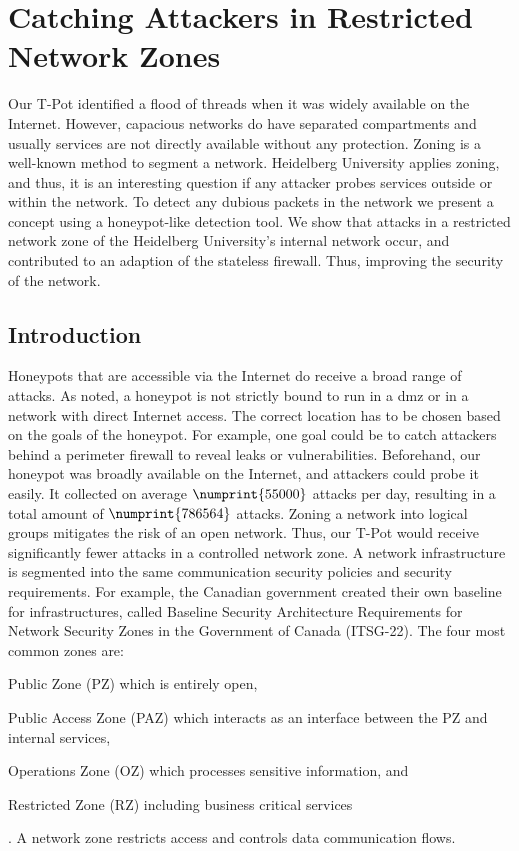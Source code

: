 \chapter{Catching Attackers in Restricted Network Zones}
\label{chap:concept}

Our T-Pot identified a flood of threads when it was widely available on the Internet.
However, capacious networks do have separated compartments and usually services are not directly available without any protection.
Zoning is a well-known method to segment a network.
Heidelberg University applies zoning, and thus, it is an interesting question if any attacker probes services outside or within the network.
To detect any dubious packets in the network we present a concept using a honeypot-like detection tool.
We show that attacks in a restricted network zone of the Heidelberg University's internal network occur, and contributed to an adaption of the stateless firewall.
Thus, improving the security of the network.

\section{Introduction}

Honeypots that are accessible via the Internet do receive a broad range of attacks.
As \citet{Spitzner2003} noted, a honeypot is not strictly bound to run in a \ac{dmz} or in a network with direct Internet access.
The correct location has to be chosen based on the goals of the honeypot.
For example, one goal could be to catch attackers behind a perimeter firewall to reveal leaks or vulnerabilities.
Beforehand, our honeypot was broadly available on the Internet, and attackers could probe it easily.
It collected on average $\numprint{55000}$ attacks per day, resulting in a total amount of $\numprint{786564}$ attacks.
Zoning a network into logical groups mitigates the risk of an open network.
Thus, our T-Pot would receive significantly fewer attacks in a controlled network zone.
A network infrastructure is segmented into the same communication security policies and security requirements.
For example, the Canadian government created their own baseline for infrastructures, called Baseline Security Architecture Requirements for Network Security Zones in the Government of Canada (ITSG-22).
The four most common zones are:
\begin{enumerate*}[label=(\roman*)]
    \item Public Zone (PZ) which is entirely open,
    \item Public Access Zone (PAZ) which interacts as an interface between the PZ and internal services,
    \item Operations Zone (OZ) which processes sensitive information, and
    \item Restricted Zone (RZ) including business critical services
\end{enumerate*}.
A network zone restricts access and controls data communication flows. \cite{csec2021}

